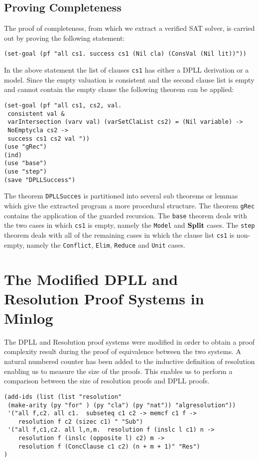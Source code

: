 \subsection*{Proving Completeness}
The proof of completeness, from which we extract a verified SAT solver, is carried out by proving the following statement:

\begin{center}
\texttt{(set-goal (pf "all cs1. success cs1 (Nil cla) (ConsVal (Nil lit))"))}
\end{center}

In the above statement the list of clauses \texttt{cs1} has either a DPLL derivation or a model. Since the empty valuation is consistent and the second clause list is empty and cannot contain the empty clause the following theorem can be applied:


\begin{lstlisting}[caption = "Beginning of the Completeness Proof"]
(set-goal (pf "all cs1, cs2, val.  
 consistent val & 
 varIntersection (varv val) (varSetClaList cs2) = (Nil variable) -> 
 NoEmptycla cs2 ->  
 success cs1 cs2 val "))
(use "gRec")
(ind)
(use "base")
(use "step")
(save "DPLLSuccess")
\end{lstlisting}

The theorem \texttt{DPLLSucces} is partitioned into several sub theorems or lemmas which give the extracted program a more procedural structure. The theorem \texttt{gRec} contains the application of the guarded recursion.  The \texttt{base} theorem deals with the two cases in which \texttt{cs1} is empty, namely the \texttt{Model} and $\mathbf{Split}$ cases. The \texttt{step} theorem deals with all of the remaining cases in which the clause list \texttt{cs1} is non-empty, namely the \texttt{Conflict}, \texttt{Elim}, \texttt{Reduce} and \texttt{Unit} cases.


\section{The Modified DPLL and  Resolution Proof Systems in Minlog}
The DPLL and Resolution proof systems were modified in order to obtain a proof complexity result during the proof of equivalence between the two systems. A natural numbered counter has been added to the inductive definition of resolution enabling us to measure the size of the proofs. This enables us to perform a comparison between the size of resolution proofs and DPLL proofs.


\begin{lstlisting}
(add-ids (list (list "resolution" 
 (make-arity (py "for" ) (py "cla") (py "nat")) "algresolution"))
 '("all f,c2. all c1.  subseteq c1 c2 -> memcf c1 f -> 
    resolution f c2 (sizec c1) " "Sub")
 '("all f,c1,c2. all l,n,m.  resolution f (inslc l c1) n -> 
    resolution f (inslc (opposite l) c2) m -> 
    resolution f (ConcClause c1 c2) (n + m + 1)" "Res")
)
\end{lstlisting}

